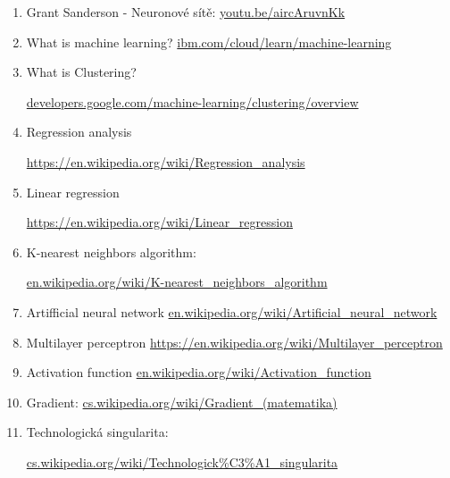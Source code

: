 \documentclass[a4paper,11pt, oneside]{book} \usepackage[czech]{babel}
\begin{document}
	\begin{enumerate}
		\item Grant Sanderson - Neuronové sítě:
			\href{https://youtu.be/aircAruvnKk}{youtu.be/aircAruvnKk}

		\item What is machine learning?
			\href{https://www.ibm.com/cloud/learn/machine-learning}{ibm.com/cloud/learn/machine-learning}

		\item What is Clustering?

			\href{https://developers.google.com/machine-learning/clustering/overview}{developers.google.com/machine-learning/clustering/overview}

		\item Regression analysis

			\href{https://en.wikipedia.org/wiki/Regression\_analysis}{https://en.wikipedia.org/wiki/Regression\_analysis}

		\item Linear regression

			\href{https://en.wikipedia.org/wiki/Linear\_regression}{https://en.wikipedia.org/wiki/Linear\_regression}

		\item K-nearest neighbors algorithm:

			\href{https://en.wikipedia.org/wiki/K-nearest\_neighbors\_algorithm}{en.wikipedia.org/wiki/K-nearest\_neighbors\_algorithm}

		\item Artifficial neural network
			\href{https://en.wikipedia.org/wiki/Artificial\_neural\_network}{en.wikipedia.org/wiki/Artificial\_neural\_network}

		\item Multilayer perceptron
			\href{https://en.wikipedia.org/wiki/Multilayer\_perceptron}{https://en.wikipedia.org/wiki/Multilayer\_perceptron}

		\item Activation function
			\href{https://en.wikipedia.org/wiki/Activation\_function}{en.wikipedia.org/wiki/Activation\_function}

		\item Gradient:
				\href{https://cs.wikipedia.org/wiki/Gradient\_(matematika)}{cs.wikipedia.org/wiki/Gradient\_(matematika)}

		\item Technologická singularita:

			\href{https://cs.wikipedia.org/wiki/Technologick\%C3\%A1\_singularita}{cs.wikipedia.org/wiki/Technologick\%C3\%A1\_singularita}

	\end{enumerate}
\end{document}

